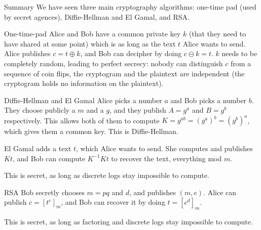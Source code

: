 \documentclass[a4paper]{article}
\begin{document}
\begin{parag}{Summary}
    We have seen three main cryptography algorithms: one-time pad (used by secret agences), Diffie-Hellman and El Gamal, and RSA. 

    \begin{subparag}{One-time-pad}
        Alice and Bob have a common private key $k$ (that they need to have shared at some point) which is as long as the text $t$ Alice wants to send. Alice publishes $c = t \oplus k$, and Bob can decipher by doing $c \ominus k = t$. $k$ needs to be completely random, leading to perfect secrecy: nobody can distinguish $c$ from a sequence of coin flips, the cryptogram and the plaintext are independent (the cryptogram holds no information on the plaintext).
    \end{subparag}

    \begin{subparag}{Diffie-Hellman and El Gamal}
        Alice picks a number $a$ and Bob picks a number $b$. They choose publicly a $m$ and a $g$, and they publish $A = g^a$ and $B = g^b$ respectively. This allows both of them to compute $K = g^{ab} = \left(g^a\right)^b = \left(g^b\right)^a$, which gives them a common key. This is Diffie-Hellman.

        El Gamal adds a text $t$, which Alice wants to send. She computes and publishes $K t$, and Bob can compute $K^{-1} K t$ to recover the text, everything mod $m$.

        This is secret, as long as discrete logs stay impossible to compute.
    \end{subparag}

    \begin{subparag}{RSA}
        Bob secretly chooses $m = pq$ and $d$, and publishes $\left(m, e\right)$. Alice can publish $c = \left[t^e\right]_m$, and Bob can recover it by doing $t = \left[c^d\right]_m$.

        This is secret, as long as factoring and discrete logs stay impossible to compute.
    \end{subparag}
\end{parag}
\end{document}
